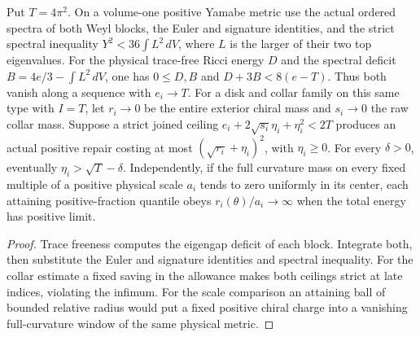 \begin{proposition}
\label{prop:ed03-endpoint-windows}
\leanok
Put \(T=4\pi^2\). On a volume-one positive Yamabe metric use the actual
ordered spectra of both Weyl blocks, the Euler and signature identities,
and the strict spectral inequality \(Y^2<36\int L^2\,dV\), where
\(L\) is the larger of their two top eigenvalues. For the physical
trace-free Ricci energy \(D\) and the spectral deficit
\(B=4e/3-\int L^2\,dV\), one has \(0\le D, B\) and
\(D+3B<8(e-T)\). Thus both vanish along a sequence with \(e_i\to T\).
For a disk and collar family on this same type with \(I=T\), let
\(r_i\to0\) be the entire exterior chiral mass and \(s_i\to0\) the
raw collar mass. Suppose a strict joined ceiling
\(e_i+2\sqrt{s_i}\eta_i+\eta_i^2<2T\) produces an actual positive
repair costing at most \((\sqrt{r_i}+\eta_i)^2\), with
\(\eta_i\ge0\). For every \(\delta>0\), eventually
\(\eta_i>\sqrt T-\delta\). Independently, if the full curvature
mass on every fixed multiple of a positive physical scale \(a_i\) tends to
zero uniformly in its center, each attaining positive-fraction quantile
obeys \(r_i(\theta)/a_i\to\infty\) when the total energy has positive limit.
\end{proposition}
\begin{proof}
\leanok
Trace freeness computes the eigengap deficit of each block. Integrate
both, then substitute the Euler and signature identities and spectral
inequality. For the collar estimate a fixed saving in the allowance
makes both ceilings strict at late indices, violating the infimum.
For the scale comparison an attaining ball of bounded relative radius
would put a fixed positive chiral charge into a vanishing full-curvature
window of the same physical metric.
\end{proof}
